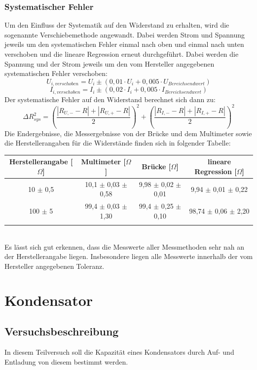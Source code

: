 \documentclass[12pt,a4paper]{article}
\begin{document}
\subsubsection{Systematischer Fehler}
Um den Einfluss der Systematik auf den Widerstand zu erhalten, wird die sogenannte Verschiebemethode angewandt. Dabei werden Strom und Spannung jeweils um den systematischen Fehler einmal nach oben und einmal nach unten verschoben und die lineare Regression erneut durchgeführt. Dabei werden die Spannung und der Strom jeweils um den vom Hersteller angegebenen systematischen Fehler verschoben:
\begin{equation}
U_{i, verschoben} = U_i \pm (0,01 \cdot U_i + 0,005 \cdot U_{Bereichsendwert})
\end{equation}
\begin{equation}
I_{i, verschoben} = I_i \pm (0,02 \cdot I_i + 0,005 \cdot I_{Bereichsendwert})
\end{equation}
Der systematische Fehler auf den Widerstand berechnet sich dann zu:
\begin{equation}
\Delta R_{sys}^2 = \left(\dfrac{|R_{U,-}-R| + |R_{U,+}-R|}{2}\right)^2 + \left(\dfrac{|R_{I,-}-R| + |R_{I,+}-R|}{2}\right)^2
\end{equation}
Die Endergebnisse, die Messergebnisse von der Brücke und dem Multimeter sowie die Herstellerangaben für die Widerstände finden sich in folgender Tabelle:\\
\begin{tabular}{|c|c|c|c|}
\hline 
Herstellerangabe [$\Omega$] & Multimeter [$\Omega$] & Brücke [$\Omega$] & lineare Regression [$\Omega$] \\ 
\hline 
10 $\pm$ 0,5 & 10,1 $\pm$ 0,03 $\pm$ 0,58 & 9,98 $\pm$ 0,02 $\pm$ 0,01 & 9,94 $\pm$ 0,01 $\pm$ 0,22 \\ 
\hline 
100 $\pm$ 5 & 99,4 $\pm$ 0,03 $\pm$ 1,30 & 99,4 $\pm$ 0,25 $\pm$ 0,10 & 98,74 $\pm$ 0,06 $\pm$ 2,20 \\ 
\hline 
\label{tab:Widerstand_Ergebnisse}
\end{tabular} \\
Es lässt sich gut erkennen, dass die Messwerte aller Messmethoden sehr nah an der Herstellerangabe liegen. Insbesondere liegen alle Messwerte innerhalb der vom Hersteller angegebenen Toleranz.

\section{Kondensator}
\subsection{Versuchsbeschreibung}
In diesem Teilversuch soll die Kapazität eines Kondensators durch Auf- und Entladung von diesem bestimmt werden.
\end{document}

